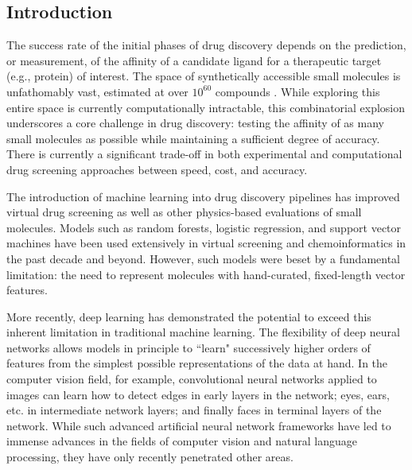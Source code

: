 \subsection{Introduction}


The success rate of the initial phases of drug discovery depends on the prediction, or measurement, of the affinity of a candidate ligand for a therapeutic target (e.g., protein) of interest. The space of synthetically accessible small molecules is unfathomably vast, estimated at over $10^{60}$ compounds \cite{virshup2013stochastic}. While exploring this entire space is currently computationally intractable, this combinatorial explosion underscores a core challenge in drug discovery: testing the affinity of as many small molecules as possible while maintaining a sufficient degree of accuracy. There is currently a significant trade-off in both experimental and computational drug screening approaches between speed, cost, and accuracy.\cite{dragiev2011systematic, wang2015accurate, trott2010autodock}

The introduction of machine learning into drug discovery pipelines has improved virtual drug screening as well as other physics-based evaluations of small molecules. Models such as random forests, logistic regression, and support vector machines \cite{svetnik2003random} have been used  extensively in virtual screening and chemoinformatics in the past decade and beyond. However, such models were beset by a fundamental limitation: the need to represent molecules with hand-curated, fixed-length vector features.

More recently, deep learning has demonstrated the potential to exceed this inherent limitation in traditional machine learning. The flexibility of deep neural networks allows models in principle to ``learn" successively higher orders of features from the simplest possible representations of the data at hand. In the computer vision field, for example, convolutional neural networks \cite{krizhevsky2012imagenet} applied to images can learn how to detect edges in early layers in the network; eyes, ears, etc. in intermediate network layers; and finally faces in terminal layers of the network. While such advanced artificial neural network frameworks have led to immense advances in the fields of computer vision and natural language processing, they have only recently penetrated other areas. 


